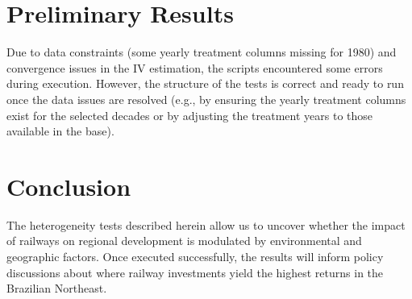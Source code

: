 \documentclass{article}
\begin{document}
\section{Preliminary Results}
Due to data constraints (some yearly treatment columns missing for 1980) and convergence issues in the IV estimation, the scripts encountered some errors during execution. However, the structure of the tests is correct and ready to run once the data issues are resolved (e.g., by ensuring the yearly treatment columns exist for the selected decades or by adjusting the treatment years to those available in the base).

\section{Conclusion}
The heterogeneity tests described herein allow us to uncover whether the impact of railways on regional development is modulated by environmental and geographic factors. Once executed successfully, the results will inform policy discussions about where railway investments yield the highest returns in the Brazilian Northeast.
\end{document}
